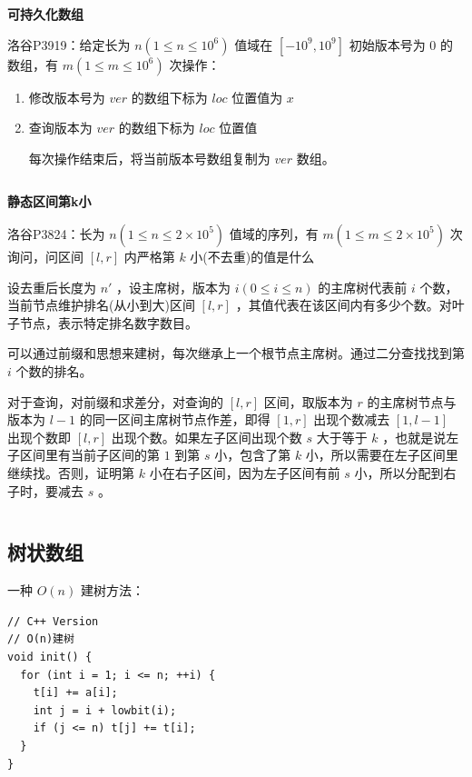 \documentclass[twocolumn,10pt]{ctexart}
\makeatletter
\newcommand{\hfive}[1]{\par\addvspace{6pt}\@afterindentfalse
  {\noindent\bfseries\normalsize #1}\par\nobreak\vspace{2pt}}
\makeatother
\begin{document}
\hfive{可持久化数组}

\begin{notebox}
洛谷P3919：给定长为 $n(1\le n\le10^6)$ 值域在 $[-10^9,10^9]$ 初始版本号为 $0$ 的数组，有 $m(1\le m\le 10^6)$ 次操作：

\begin{enumerate}
\item 修改版本号为 $ver$ 的数组下标为 $loc$ 位置值为 $x$
\item 查询版本为 $ver$ 的数组下标为 $loc$ 位置值

每次操作结束后，将当前版本号数组复制为 $ver$ 数组。
\end{enumerate}
\end{notebox}

\inputminted{cpp}{code/p3919_presistent_seg.cpp}

\hfive{静态区间第k小}

\begin{notebox}
洛谷P3824：长为 $n(1\le n\le2\times 10^5)$ 值域的序列，有 $m(1\le m\le2\times 10^5)$ 次询问，问区间 $[l,r]$ 内严格第 $k$ 小(不去重)的值是什么
\end{notebox}

设去重后长度为 $n'$ ，设主席树，版本为 $i(0\le i\le n)$ 的主席树代表前 $i$ 个数，当前节点维护排名(从小到大)区间 $[l,r]$ ，其值代表在该区间内有多少个数。对叶子节点，表示特定排名数字数目。

可以通过前缀和思想来建树，每次继承上一个根节点主席树。通过二分查找找到第 $i$ 个数的排名。

对于查询，对前缀和求差分，对查询的 $[l,r]$ 区间，取版本为 $r$ 的主席树节点与版本为 $l-1$ 的同一区间主席树节点作差，即得 $[1,r]$ 出现个数减去 $[1,l-1]$ 出现个数即 $[l,r]$ 出现个数。如果左子区间出现个数 $s$ 大于等于 $k$ ，也就是说左子区间里有当前子区间的第 $1$ 到第 $s$ 小，包含了第 $k$ 小，所以需要在左子区间里继续找。否则，证明第 $k$ 小在右子区间，因为左子区间有前 $s$ 小，所以分配到右子时，要减去 $s$ 。

\inputminted{cpp}{code/p3834_presistent_seg.cpp}

\subsection{树状数组}

一种 $O(n)$ 建树方法：

\begin{verbatim}
// C++ Version
// O(n)建树
void init() {
  for (int i = 1; i <= n; ++i) {
    t[i] += a[i];
    int j = i + lowbit(i);
    if (j <= n) t[j] += t[i];
  }
}
\end{verbatim}
\end{document}
